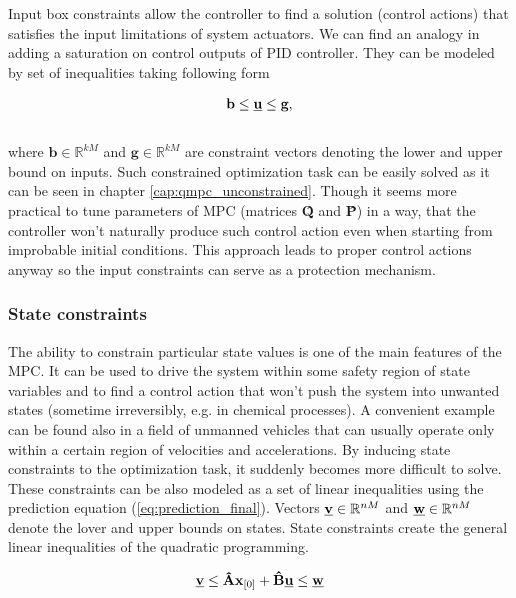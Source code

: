 Input box constraints allow the controller to find a solution (control actions) that satisfies the input limitations of system actuators. We can find an analogy in adding a saturation on control outputs of PID controller. They can be modeled by set of inequalities taking following form

\begin{equation}
\begin{split}
\textbf{b} \leq \textbf{\underline{u}} \leq \textbf{g},
\end{split}
\label{eq:qmpc_input_constraints}
\end{equation}
\\
where $\textbf{b} \in \mathbb{R}^{kM}$ and $\textbf{g} \in \mathbb{R}^{kM}$ are constraint vectors denoting the lower and upper bound on inputs. Such constrained optimization task can be easily solved as it can be seen in chapter \ref{cap:qmpc_unconstrained}. Though it seems more practical to tune parameters of MPC (matrices \textbf{\^Q} and \textbf{\^P}) in a way, that the controller won't naturally produce such control action even when starting from improbable initial conditions. This approach leads to proper control actions anyway so the input constraints can serve as a protection mechanism.

\subsubsection{State constraints}
 
The ability to constrain particular state values is one of the main features of the MPC. It can be used to drive the system within some safety region of state variables and to find a control action that won't push the system into unwanted states (sometime irreversibly, e.g. in chemical processes). A convenient example can be found also in a field of unmanned vehicles that can usually operate only within a certain region of velocities and accelerations. By inducing state constraints to the optimization task, it suddenly becomes more difficult to solve. These constraints can be also modeled as a set of linear inequalities using the prediction equation (\ref{eq:prediction_final}). Vectors $\textbf{\underline{v}} \in \mathbb{R}^{nM}$ and $\textbf{\underline{w}} \in \mathbb{R}^{nM}$ denote the lover and upper bounds on states. State constraints create the general linear inequalities of the quadratic programming.
 
\begin{equation}
\textbf{\underline{v}} \leq \textbf{\^A}\textbf{x}_{[0]} + \textbf{\^B}\textbf{\underline{u}} \leq \textbf{\underline{w}}
\label{eq:qmpc_state_constraints}
\end{equation}

